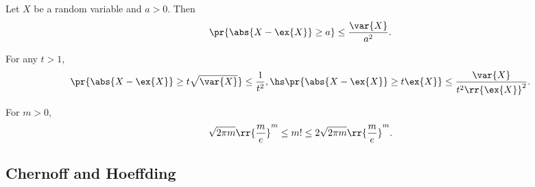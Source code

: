 \documentclass{article}
\begin{document}
\begin{theorem}
  Let $X$ be a random variable and $a>0$. Then
  \begin{align*}
    \pr{\abs{X-\ex{X}}\geq a}\leq \frac{\var{X}}{a^2}.
  \end{align*}
\end{theorem}

\begin{corollary}
  For any $t>1$,
  \begin{align*}
    \pr{\abs{X-\ex{X}}\geq t\sqrt{\var{X}}}\leq \frac{1}{t^2}, \hs
    \pr{\abs{X-\ex{X}}\geq t\ex{X}}\leq \frac{\var{X}}{t^2\rr{\ex{X}}^2}.
  \end{align*}
\end{corollary}

\begin{lemma}[Stirling]
  For $m>0$,
  \begin{align*}
    \sqrt{2\pi m}\rr{\frac{m}{e}}^m \leq m! \leq 2\sqrt{2\pi m}\rr{\frac{m}{e}}^m.
  \end{align*}
\end{lemma}

\subsection{Chernoff and Hoeffding}
\end{document}
